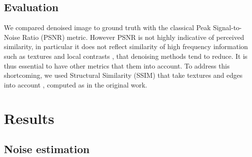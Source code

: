 \documentclass{article}
\begin{document}
\subsection{Evaluation}
We compared denoised image to ground truth with the classical Peak Signal-to-Noise Ratio (PSNR) metric.
However PSNR is not highly indicative of perceived similarity, in particular it does not reflect similarity of high frequency information such as textures and local contrasts \cite{wang2004image}, that denoising methods tend to reduce. It is thus essential to have other metrics that them into account.
To address this shortcoming, we used Structural Similarity (SSIM) that take textures and edges into account \cite{wang2004image}, computed as in the original work.

\section{Results}
\label{sec:results}
\subsection{Noise estimation}
\end{document}
